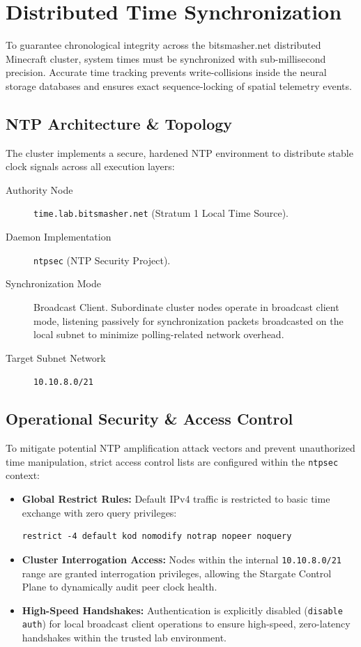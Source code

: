 \chapter{Distributed Time Synchronization}

To guarantee chronological integrity across the bitsmasher.net distributed Minecraft cluster, system times must be synchronized with sub-millisecond precision. Accurate time tracking prevents write-collisions inside the neural storage databases and ensures exact sequence-locking of spatial telemetry events.

\section{NTP Architecture \& Topology}
The cluster implements a secure, hardened NTP environment to distribute stable clock signals across all execution layers:

\begin{description}
    \item[Authority Node] \texttt{time.lab.bitsmasher.net} (Stratum 1 Local Time Source).
    \item[Daemon Implementation] \texttt{ntpsec} (NTP Security Project).
    \item[Synchronization Mode] Broadcast Client. Subordinate cluster nodes operate in broadcast client mode, listening passively for synchronization packets broadcasted on the local subnet to minimize polling-related network overhead.
    \item[Target Subnet Network] \texttt{10.10.8.0/21}
\end{description}

\section{Operational Security \& Access Control}
To mitigate potential NTP amplification attack vectors and prevent unauthorized time manipulation, strict access control lists are configured within the \texttt{ntpsec} context:

\begin{itemize}
    \item \textbf{Global Restrict Rules:} Default IPv4 traffic is restricted to basic time exchange with zero query privileges:
    \begin{lstlisting}[style=bashstyle]
restrict -4 default kod nomodify notrap nopeer noquery
    \end{lstlisting}
    \item \textbf{Cluster Interrogation Access:} Nodes within the internal \texttt{10.10.8.0/21} range are granted interrogation privileges, allowing the Stargate Control Plane to dynamically audit peer clock health.
    \item \textbf{High-Speed Handshakes:} Authentication is explicitly disabled (\texttt{disable auth}) for local broadcast client operations to ensure high-speed, zero-latency handshakes within the trusted lab environment.
\end{itemize}

